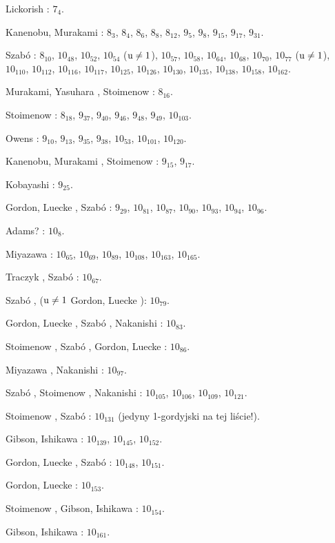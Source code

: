 \begin{compactitem}
\item Lickorish \cite{lickorish85}: $7_{4}$.
\item Kanenobu, Murakami \cite{kanenobumurakami86}: $8_{3}$, $8_{4}$, $8_{6}$, $8_{8}$, $8_{12}$, $9_{5}$, $9_{8}$, $9_{15}$, $9_{17}$, $9_{31}$.
\item Szabó \cite{szabo05}: $8_{10}$, $10_{48}$, $10_{52}$, $10_{54}$ ($\operatorname{u} \neq 1$), $10_{57}$, $10_{58}$, $10_{64}$, $10_{68}$, $10_{70}$, $10_{77}$ ($\operatorname{u} \neq 1$), $10_{110}$, $10_{112}$, $10_{116}$, $10_{117}$, $10_{125}$, $10_{126}$, $10_{130}$, $10_{135}$, $10_{138}$, $10_{158}$, $10_{162}$.
\item Murakami, Yasuhara \cite{yasuhara00}, Stoimenow \cite{stoimenow04}: $8_{16}$.
\item Stoimenow \cite{stoimenow04}: $8_{18}$, $9_{37}$, $9_{40}$, $9_{46}$, $9_{48}$, $9_{49}$, $10_{103}$.
\item Owens \cite{owens08}: $9_{10}$, $9_{13}$, $9_{35}$, $9_{38}$, $10_{53}$, $10_{101}$, $10_{120}$.
\item Kanenobu, Murakami \cite{kanenobumurakami86}, Stoimenow \cite{stoimenow04}: $9_{15}$, $9_{17}$.
\item Kobayashi \cite{kobayashi89}: $9_{25}$.
\item Gordon, Luecke \cite{gordon06}, Szabó \cite{szabo05}: $9_{29}$, $10_{81}$, $10_{87}$, $10_{90}$, $10_{93}$, $10_{94}$, $10_{96}$.
\item Adams? \cite[s. 62]{adams94}: $10_{8}$.
\item Miyazawa \cite{miyazawa98}: $10_{65}$, $10_{69}$, $10_{89}$, $10_{108}$, $10_{163}$, $10_{165}$.
\item Traczyk \cite{traczyk99}, Szabó \cite{szabo05}: $10_{67}$.
\item Szabó \cite{szabo05}, ($\operatorname{u} \neq 1$ Gordon, Luecke \cite{gordon06}): $10_{79}$.
\item Gordon, Luecke \cite{gordon06}, Szabó \cite{szabo05}, Nakanishi \cite{nakanishi05}: $10_{83}$.
\item Stoimenow \cite{stoimenow04}, Szabó \cite{szabo05}, Gordon, Luecke \cite{gordon06}: $10_{86}$.
\item Miyazawa \cite{miyazawa98}, Nakanishi \cite{nakanishi05}: $10_{97}$.
\item Szabó \cite{szabo05}, Stoimenow \cite{stoimenow04}, Nakanishi \cite{nakanishi05}: $10_{105}$, $10_{106}$, $10_{109}$, $10_{121}$.
\item Stoimenow \cite{stoimenow04}, Szabó \cite{szabo05}: $10_{131}$ (jedyny 1-gordyjski na tej liście!).
\item Gibson, Ishikawa \cite{ishikawa02}: $10_{139}$, $10_{145}$, $10_{152}$.
\item Gordon, Luecke \cite{gordon06}, Szabó \cite{szabo05}: $10_{148}$, $10_{151}$.
\item Gordon, Luecke \cite{gordon06}: $10_{153}$.
\item Stoimenow \cite{stoimenow03}, Gibson, Ishikawa \cite{ishikawa02}: $10_{154}$.
\item Gibson, Ishikawa \cite{ishikawa02}: $10_{161}$.
\end{compactitem}

